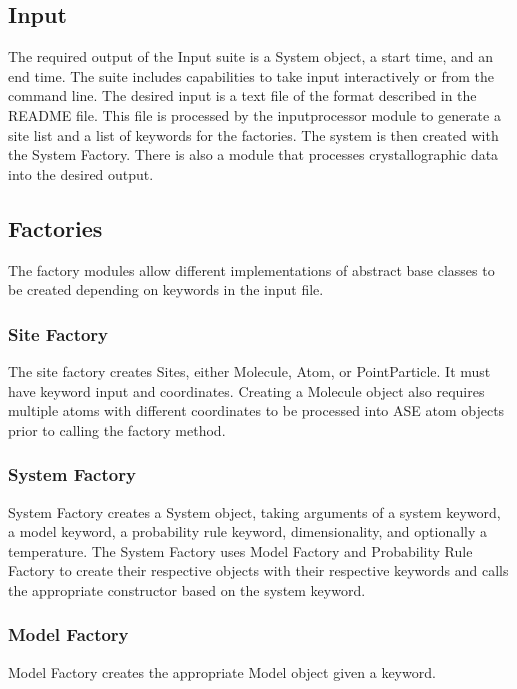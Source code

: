 \documentclass{article}
\begin{document}
\subsection{Input}

The required output of the Input suite is a System object, a start time, and an end time. The suite includes capabilities to take input interactively or from the command line. The desired input is a text file of the format described in the README file. This file is processed by the inputprocessor module to generate a site list and a list of keywords for the factories. The system is then created with the System Factory. There is also a module that processes crystallographic data into the desired output.


\subsection{Factories}

The factory modules allow different implementations of abstract base classes to be created depending on keywords in the input file.

\subsubsection{Site Factory}

The site factory creates Sites, either Molecule, Atom, or PointParticle. It must have keyword input and coordinates. Creating a Molecule object also requires multiple atoms with different coordinates to be processed into ASE atom objects prior to calling the factory method.

\subsubsection{System Factory}

System Factory creates a System object, taking arguments of a system keyword, a model keyword, a probability rule keyword, dimensionality, and optionally a temperature. The System Factory uses Model Factory and Probability Rule Factory to create their respective objects with their respective keywords and calls the appropriate constructor based on the system keyword.

\subsubsection{Model Factory}

Model Factory creates the appropriate Model object given a keyword.
\end{document}
